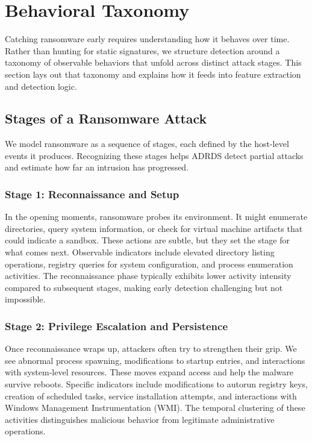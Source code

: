 
\section{Behavioral Taxonomy}

Catching ransomware early requires understanding how it behaves over time. Rather than hunting for static signatures, we structure detection around a taxonomy of observable behaviors that unfold across distinct attack stages. This section lays out that taxonomy and explains how it feeds into feature extraction and detection logic.

\subsection{Stages of a Ransomware Attack}

We model ransomware as a sequence of stages, each defined by the host-level events it produces. Recognizing these stages helps ADRDS detect partial attacks and estimate how far an intrusion has progressed.

\subsubsection{Stage 1: Reconnaissance and Setup}
In the opening moments, ransomware probes its environment. It might enumerate directories, query system information, or check for virtual machine artifacts that could indicate a sandbox. These actions are subtle, but they set the stage for what comes next. Observable indicators include elevated directory listing operations, registry queries for system configuration, and process enumeration activities. The reconnaissance phase typically exhibits lower activity intensity compared to subsequent stages, making early detection challenging but not impossible.

\subsubsection{Stage 2: Privilege Escalation and Persistence}
Once reconnaissance wraps up, attackers often try to strengthen their grip. We see abnormal process spawning, modifications to startup entries, and interactions with system-level resources. These moves expand access and help the malware survive reboots. Specific indicators include modifications to autorun registry keys, creation of scheduled tasks, service installation attempts, and interactions with Windows Management Instrumentation (WMI). The temporal clustering of these activities distinguishes malicious behavior from legitimate administrative operations.

